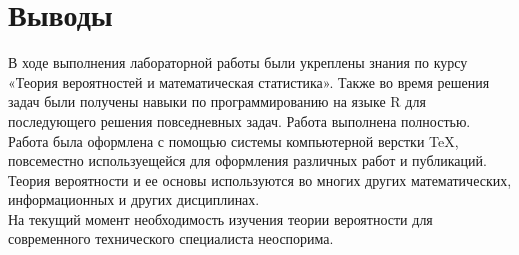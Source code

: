 \chapter{Выводы}
В ходе выполнения лабораторной работы были укреплены знания по курсу «Теория вероятностей и математическая статистика». Также во время решения задач были получены навыки по программированию на языке R для последующего решения повседневных задач. Работа выполнена полностью.\\
Работа была оформлена с помощью системы компьютерной верстки \TeX, повсеместно используещейся для оформления различных работ и публикаций.\\
Теория вероятности и ее основы используются во многих других математических, информационных и других дисциплинах.\\
На текущий момент необходимость изучения теории вероятности для современного технического специалиста неоспорима.
